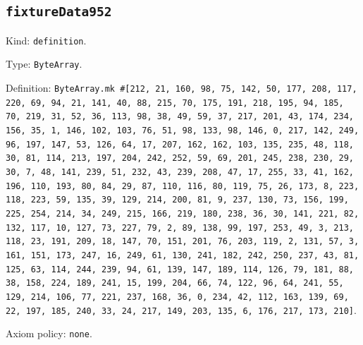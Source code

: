 \documentclass[11pt]{article}
\begin{document}
\subsection*{\texttt{fixtureData952}}
\noindent Kind: \texttt{definition}.\par
\noindent Type: \texttt{ByteArray}.\par
\noindent Definition: \texttt{ByteArray.mk \#[212, 21, 160, 98, 75, 142, 50, 177, 208, 117, 220, 69, 94, 21, 141, 40, 88, 215, 70, 175, 191, 218, 195, 94, 185, 70, 219, 31, 52, 36, 113, 98, 38, 49, 59, 37, 217, 201, 43, 174, 234, 156, 35, 1, 146, 102, 103, 76, 51, 98, 133, 98, 146, 0, 217, 142, 249, 96, 197, 147, 53, 126, 64, 17, 207, 162, 162, 103, 135, 235, 48, 118, 30, 81, 114, 213, 197, 204, 242, 252, 59, 69, 201, 245, 238, 230, 29, 30, 7, 48, 141, 239, 51, 232, 43, 239, 208, 47, 17, 255, 33, 41, 162, 196, 110, 193, 80, 84, 29, 87, 110, 116, 80, 119, 75, 26, 173, 8, 223, 118, 223, 59, 135, 39, 129, 214, 200, 81, 9, 237, 130, 73, 156, 199, 225, 254, 214, 34, 249, 215, 166, 219, 180, 238, 36, 30, 141, 221, 82, 132, 117, 10, 127, 73, 227, 79, 2, 89, 138, 99, 197, 253, 49, 3, 213, 118, 23, 191, 209, 18, 147, 70, 151, 201, 76, 203, 119, 2, 131, 57, 3, 161, 151, 173, 247, 16, 249, 61, 130, 241, 182, 242, 250, 237, 43, 81, 125, 63, 114, 244, 239, 94, 61, 139, 147, 189, 114, 126, 79, 181, 88, 38, 158, 224, 189, 241, 15, 199, 204, 66, 74, 122, 96, 64, 241, 55, 129, 214, 106, 77, 221, 237, 168, 36, 0, 234, 42, 112, 163, 139, 69, 22, 197, 185, 240, 33, 24, 217, 149, 203, 135, 6, 176, 217, 173, 210]}.\par
\noindent Axiom policy: \texttt{none}.\par
\end{document}
